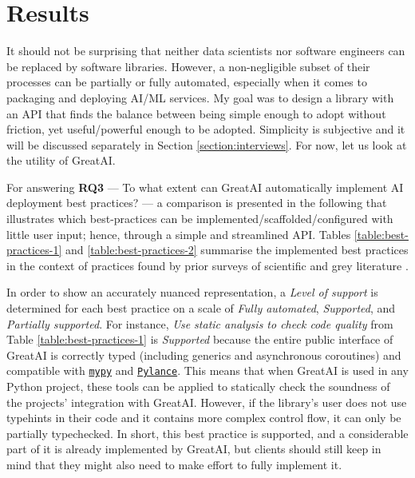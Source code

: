 \chapter{Results} \label{chapter:interviews}

It should not be surprising that neither data scientists nor software engineers can be replaced by software libraries. However, a non-negligible subset of their processes can be partially or fully automated, especially when it comes to packaging and deploying AI/ML services. My goal was to design a library with an API that finds the balance between being simple enough to adopt without friction, yet useful/powerful enough to be adopted. Simplicity is subjective and it will be discussed separately in Section \ref{section:interviews}. For now, let us look at the utility of GreatAI.

For answering \textbf{RQ3} --- To what extent can GreatAI automatically implement AI deployment best practices? --- a comparison is presented in the following that illustrates which best-practices can be implemented/scaffolded/configured with little user input; hence, through a simple and streamlined API. Tables \ref{table:best-practices-1} and \ref{table:best-practices-2} summarise the implemented best practices in the context of practices found by prior surveys of scientific and grey literature \cite{serban2020adoption,serban2021practices,john2020architecting}.

In order to show an accurately nuanced representation, a \textit{Level of support} is determined for each best practice on a scale of \textit{Fully automated}, \textit{Supported}, and \textit{Partially supported}. For instance, \textit{Use static analysis to check code quality} from Table \ref{table:best-practices-1} is \textit{Supported} because the entire public interface of GreatAI is correctly typed (including generics and asynchronous coroutines) and compatible with \href{https://mypy.readthedocs.io/en/stable/index.html#}{\texttt{mypy}} and \href{https://marketplace.visualstudio.com/items?itemName=ms-python.vscode-pylance}{\texttt{Pylance}}. This means that when GreatAI is used in any Python project, these tools can be applied to statically check the soundness of the projects' integration with GreatAI. However, if the library's user does not use typehints in their code and it contains more complex control flow, it can only be partially typechecked. In short, this best practice is supported, and a considerable part of it is already implemented by GreatAI, but clients should still keep in mind that they might also need to make effort to fully implement it.

